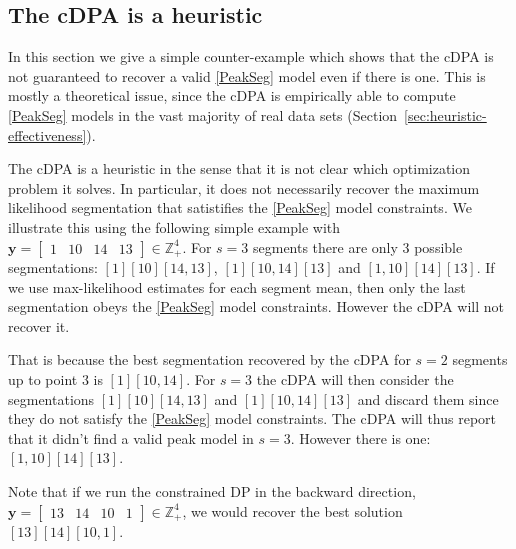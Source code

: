 \documentclass{article}
\newcommand{\ZZ}{\mathbb Z}
\begin{document}
\subsection{The cDPA is a heuristic}
\label{sec:dp-fails}

In this section we give a simple counter-example which shows that the
cDPA is not guaranteed to recover a valid \ref{PeakSeg} model even if
there is one.  This is mostly a theoretical issue, since 
the cDPA is empirically able to compute \ref{PeakSeg} models in the vast
majority of real data sets
(Section~\ref{sec:heuristic-effectiveness}).

The cDPA is a heuristic in the sense that it is not clear which
optimization problem it solves. In particular, it does not necessarily
recover the maximum likelihood segmentation that satistifies the
\ref{PeakSeg} model constraints. We illustrate this using the following simple
example with $\mathbf y = \left[\begin{array}{cccc} 1 & 10 & 14 & 13
\end{array}\right]\in\ZZ_+^4
$. For $s=3$ segments there are only 3 possible segmentations:
$[1][10][14, 13]$, $[1][10, 14][13]$ and $[1, 10][14][13]$. If we use
max-likelihood estimates for each segment mean, then only the last
segmentation obeys the \ref{PeakSeg} model constraints. However the
cDPA will not recover it.

That is because the best segmentation recovered by the cDPA for $s=2$
segments up to point $3$ is $[1][10, 14]$.
For $s=3$ the cDPA will then consider the segmentations $[1][10][14,
13]$ and $[1][10, 14][13]$ and discard them since they do not satisfy
the \ref{PeakSeg} model constraints. The cDPA will thus report that it
didn't find a valid peak model in $s=3$. However there is one: $[1,
10][14][13]$.

Note that if we run the constrained DP in the backward direction, 
$\mathbf y = \left[\begin{array}{cccc} 13 & 14 & 10 & 1
\end{array}\right]\in\ZZ_+^4
$, we would recover the best solution $[13][14][10, 1]$.


\end{document}

